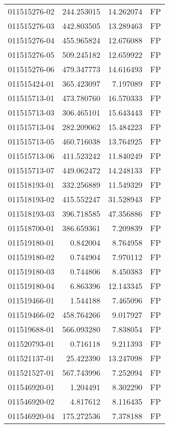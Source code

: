 \begin{tabular}{lrrl}
011515276-02 &  244.253015 &    14.262074 &   FP \\
011515276-03 &  442.803505 &    13.289463 &   FP \\
011515276-04 &  455.965824 &    12.676088 &   FP \\
011515276-05 &  509.245182 &    12.659922 &   FP \\
011515276-06 &  479.347773 &    14.616493 &   FP \\
011515424-01 &  365.423097 &     7.197089 &   FP \\
011515713-01 &  473.780760 &    16.570333 &   FP \\
011515713-03 &  306.465101 &    15.643443 &   FP \\
011515713-04 &  282.209062 &    15.484223 &   FP \\
011515713-05 &  460.716038 &    13.764925 &   FP \\
011515713-06 &  411.523242 &    11.840249 &   FP \\
011515713-07 &  449.062472 &    14.248133 &   FP \\
011518193-01 &  332.256889 &    11.549329 &   FP \\
011518193-02 &  415.552247 &    31.528943 &   FP \\
011518193-03 &  396.718585 &    47.356886 &   FP \\
011518700-01 &  386.659361 &     7.209839 &   FP \\
011519180-01 &    0.842004 &     8.764958 &   FP \\
011519180-02 &    0.744904 &     7.970112 &   FP \\
011519180-03 &    0.744806 &     8.450383 &   FP \\
011519180-04 &    6.863396 &    12.143345 &   FP \\
011519466-01 &    1.544188 &     7.465096 &   FP \\
011519466-02 &  458.764266 &     9.017927 &   FP \\
011519688-01 &  566.093280 &     7.838054 &   FP \\
011520793-01 &    0.716118 &     9.211393 &   FP \\
011521137-01 &   25.422390 &    13.247098 &   FP \\
011521527-01 &  567.743996 &     7.252094 &   FP \\
011546920-01 &    1.204491 &     8.302290 &   FP \\
011546920-02 &    4.817612 &     8.116435 &   FP \\
011546920-04 &  175.272536 &     7.378188 &   FP \\

\end{tabular}
